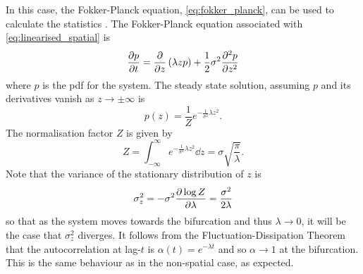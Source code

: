 In this case, the Fokker-Planck equation, \cref{eq:fokker_planck}, can be used to calculate the statistics \parencite{Risken1984}.
The Fokker-Planck equation associated with \cref{eq:linearised_spatial} is
\begin{equation}
  \label{eq:fokker_planck_linearised_spatial}
  \pdv{p}{t} = \pdv{z}\left(\lambda z p\right) + \frac{1}{2}\sigma^2 \pdv[2]{p}{z}
\end{equation}
where $p$ is the pdf for the system. The steady state solution, assuming $p$ and its derivatives vanish as $z\rightarrow \pm\infty$ is
\begin{equation}
  \label{eq:solution_to_fokker_planck}
  p(z) = \frac{1}{Z} e^{-\frac{1}{\sigma^2}\lambda z^2}.
\end{equation}
The normalisation factor $Z$ is given by
\begin{equation}
  \label{eq:partition_function}
  Z = \int_{-\infty}^{\infty} e^{-\frac{1}{\sigma^2}\lambda z^2} \dd{z} = \sigma \sqrt{\frac{\pi}{\lambda}}.
\end{equation}
Note that the variance of the stationary distribution of $z$ is
\begin{equation}
  \label{eq:var_z}
  \sigma_z^2 = -\sigma^2 \pdv{\log Z}{\lambda} = \frac{\sigma^2}{2\lambda}
\end{equation}
so that as the system moves towards the bifurcation and thus $\lambda \rightarrow 0$,  it will be the case that $\sigma_z^2$ diverges.
It follows from the Fluctuation-Dissipation Theorem \parencite{Marconi2008,Kubo1966} that the autocorrelation at lag-$t$ is $\alpha(t) = e^{-\lambda t}$ and so $\alpha \rightarrow 1$ at the bifurcation.
This is the same behaviour as in the non-spatial case, as expected.

